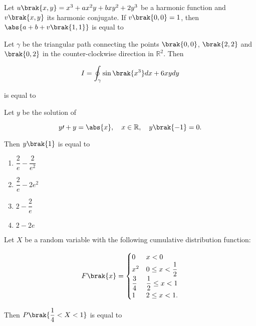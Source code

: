 \iffalse
    \title{Assignment}
    \author{EE24BTECH11034}
    \section{ma}
    \chapter{2016}
  \fi
\item Let $u\brak{x,y} = x^3 + a x^2 y + b x y^2 + 2 y^3$ be a harmonic function and $v\brak{x,y}$ its harmonic conjugate. If $v\brak{0,0} = 1$, then $\abs{a + b + v\brak{1,1}}$ is equal to \underline{\hspace{2cm}}

\item Let $\gamma$ be the triangular path connecting the points $\brak{0,0}$, $\brak{2,2}$ and $\brak{0,2}$ in the counter-clockwise direction in $\mathbb{R}^2$. Then

    $$I = \oint_{\gamma}  
    \sin\brak{x^3}dx + 6 x y dy$$

    is equal to \underline{\hspace{2cm}}

\item Let $y$ be the solution of 

    $$y\prime + y = \abs{x}, \quad x \in \mathbb{R}, \quad y\brak{-1} = 0.$$

    Then $y\brak{1}$ is equal to

    \begin{enumerate}
        \item $\dfrac{2}{e} - \dfrac{2}{e^2}$
        \item $\dfrac{2}{e} - 2 e^2$
        \item $2 - \dfrac{2}{e}$
        \item $2 - 2 e$
    \end{enumerate}

\item Let $X$ be a random variable with the following cumulative distribution function:

    $$F\brak{x} = \begin{cases}
        0 & x < 0 \\
        x^2 & 0 \leq x < \dfrac{1}{2} \\
        \dfrac{3}{4} & \dfrac{1}{2} \leq x < 1 \\
        1 & 2 \leq x < 1.
    \end{cases}$$

    Then $P\brak{\dfrac{1}{4} < X < 1}$ is equal to \underline{\hspace{2cm}}

